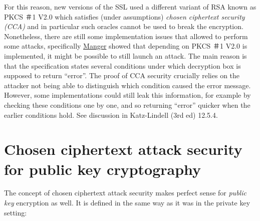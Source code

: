 For this reason, new versions of the SSL used a different variant of RSA
known as PKCS ＃1 V2.0 which satisfies (under assumptions) \emph{chosen
ciphertext security (CCA)} and in particular such oracles cannot be used
to break the encryption. Nonetheless, there are still some
implementation issues that allowed to perform some attacks, specifically
\href{http://archiv.infsec.ethz.ch/education/fs08/secsem/Manger01.pdf}{Manger}
showed that depending on PKCS ＃1 V2.0 is implemented, it might be
possible to still launch an attack. The main reason is that the
specification states several conditions under which decryption box is
supposed to return ``error''. The proof of CCA security crucially relies
on the attacker not being able to distinguish which condition caused the
error message. However, some implementations could still leak this
information, for example by checking these conditions one by one, and so
returning ``error'' quicker when the earlier conditions hold. See
discussion in Katz-Lindell (3rd ed) 12.5.4.

\section{Chosen ciphertext attack security for public key
cryptography}\label{12-Chosen-ciphertext-atta}

The concept of chosen ciphertext attack security makes perfect sense for
\emph{public key} encryption as well. It is defined in the same way as
it was in the private key setting:

\hypertarget{CCSpubdef}{}

